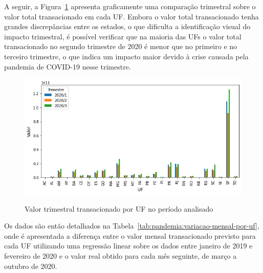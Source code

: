 A seguir, a Figura~\ref{fig:pandemia:base-de-dados-21.2-valor-trimestral-por-uf} apresenta graficamente uma comparação trimestral sobre o valor total transacionado em cada UF. Embora o valor total transacionado tenha grandes discrepâncias entre os estados, o que dificulta a identificação visual do impacto trimestral, é possível verificar que na maioria das UFs o valor total transacionado no segundo trimestre de 2020 é menor que no primeiro e no terceiro trimestre, o que indica um impacto maior devido à crise causada pela pandemia de COVID-19 nesse trimestre.

\begin{figure}[htb]
	\centering
    \caption{Valor trimestral transacionado por UF no período analisado}
    \includegraphics[scale=0.7]{images/base-de-dados-21.2-valor-trimestral-por-uf.png}
    \label{fig:pandemia:base-de-dados-21.2-valor-trimestral-por-uf}
    \fdadospesquisa
\end{figure}

Os dados são então detalhados na Tabela~\ref{tab:pandemia:variacao-mensal-por-uf}, onde é apresentada a diferença entre o valor mensal transacionado previsto para cada UF utilizando uma regressão linear sobre os dados entre janeiro de 2019 e fevereiro de 2020 e o valor real obtido para cada mês seguinte, de março a outubro de 2020.


